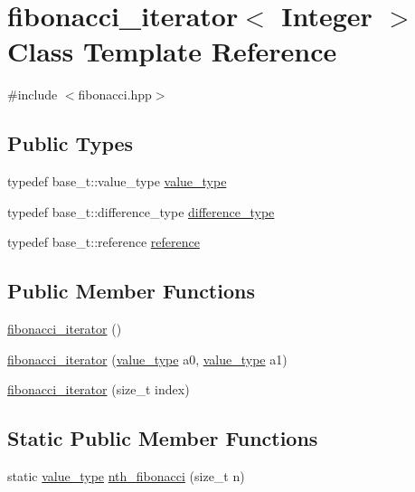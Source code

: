 \hypertarget{classyuh_1_1range__detail_1_1fibonacci__iterator}{\section{fibonacci\-\_\-iterator$<$ \-Integer $>$ \-Class \-Template \-Reference}
\label{df/d65/classyuh_1_1range__detail_1_1fibonacci__iterator}
}


{\ttfamily \#include $<$fibonacci.\-hpp$>$}

\subsection*{\-Public \-Types}
\begin{DoxyCompactItemize}
\item 
typedef base\-\_\-t\-::value\-\_\-type \hyperlink{classyuh_1_1range__detail_1_1fibonacci__iterator_ab7468d4ed49b58c84d6c1b71779fb43e}{value\-\_\-type}
\item 
typedef base\-\_\-t\-::difference\-\_\-type \hyperlink{classyuh_1_1range__detail_1_1fibonacci__iterator_a9ac6039762e1b262cecb98589ffc1d75}{difference\-\_\-type}
\item 
typedef base\-\_\-t\-::reference \hyperlink{classyuh_1_1range__detail_1_1fibonacci__iterator_aa5d67140d1557795cc6c30a2849d4e05}{reference}
\end{DoxyCompactItemize}
\subsection*{\-Public \-Member \-Functions}
\begin{DoxyCompactItemize}
\item 
\hyperlink{classyuh_1_1range__detail_1_1fibonacci__iterator_a3ff526e1378fe7cd1b2cf306e9bfbcbd}{fibonacci\-\_\-iterator} ()
\item 
\hyperlink{classyuh_1_1range__detail_1_1fibonacci__iterator_a78ff832f7e7584465406a979f7ae91e1}{fibonacci\-\_\-iterator} (\hyperlink{classyuh_1_1range__detail_1_1fibonacci__iterator_ab7468d4ed49b58c84d6c1b71779fb43e}{value\-\_\-type} a0, \hyperlink{classyuh_1_1range__detail_1_1fibonacci__iterator_ab7468d4ed49b58c84d6c1b71779fb43e}{value\-\_\-type} a1)
\item 
\hyperlink{classyuh_1_1range__detail_1_1fibonacci__iterator_a45c40764a3e5a2bfeeaf8c4c3f4b36de}{fibonacci\-\_\-iterator} (size\-\_\-t index)
\end{DoxyCompactItemize}
\subsection*{\-Static \-Public \-Member \-Functions}
\begin{DoxyCompactItemize}
\item 
static \hyperlink{classyuh_1_1range__detail_1_1fibonacci__iterator_ab7468d4ed49b58c84d6c1b71779fb43e}{value\-\_\-type} \hyperlink{classyuh_1_1range__detail_1_1fibonacci__iterator_acc92d21c640d472b2a076ccaee3a4cbf}{nth\-\_\-fibonacci} (size\-\_\-t n)
\end{DoxyCompactItemize}

